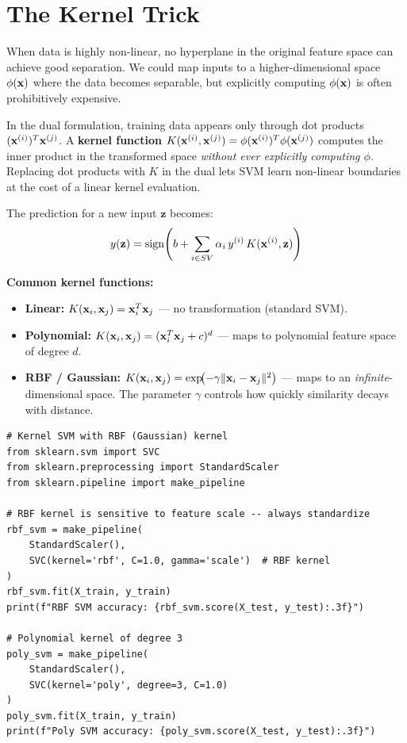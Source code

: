 \section*{The Kernel Trick}

When data is highly non-linear, no hyperplane in the original feature space can achieve good separation. We could map inputs to a higher-dimensional space $\phi(\mathbf{x})$ where the data becomes separable, but explicitly computing $\phi(\mathbf{x})$ is often prohibitively expensive.

\begin{definition}
In the dual formulation, training data appears only through dot products $(\mathbf{x}^{(i)})^T\mathbf{x}^{(j)}$. A \textbf{kernel function} $K(\mathbf{x}^{(i)}, \mathbf{x}^{(j)}) = \phi(\mathbf{x}^{(i)})^T \phi(\mathbf{x}^{(j)})$ computes the inner product in the transformed space \textit{without ever explicitly computing $\phi$}. Replacing dot products with $K$ in the dual lets SVM learn non-linear boundaries at the cost of a linear kernel evaluation.
\end{definition}

The prediction for a new input $\mathbf{z}$ becomes:
$$y(\mathbf{z}) = \text{sign}\!\left(b + \sum_{i \in SV} \alpha_i \, y^{(i)} \, K(\mathbf{x}^{(i)}, \mathbf{z})\right)$$

\textbf{Common kernel functions:}
\begin{itemize}
    \item \textbf{Linear:} $K(\mathbf{x}_i, \mathbf{x}_j) = \mathbf{x}_i^T \mathbf{x}_j$ \;---\; no transformation (standard SVM).
    \item \textbf{Polynomial:} $K(\mathbf{x}_i, \mathbf{x}_j) = (\mathbf{x}_i^T \mathbf{x}_j + c)^d$ \;---\; maps to polynomial feature space of degree $d$.
    \item \textbf{RBF / Gaussian:} $K(\mathbf{x}_i, \mathbf{x}_j) = \exp\!\bigl(-\gamma \|\mathbf{x}_i - \mathbf{x}_j\|^2\bigr)$ \;---\; maps to an \textit{infinite}-dimensional space. The parameter $\gamma$ controls how quickly similarity decays with distance.
\end{itemize}

\begin{lstlisting}[style=pythonstyle]
# Kernel SVM with RBF (Gaussian) kernel
from sklearn.svm import SVC
from sklearn.preprocessing import StandardScaler
from sklearn.pipeline import make_pipeline

# RBF kernel is sensitive to feature scale -- always standardize
rbf_svm = make_pipeline(
    StandardScaler(),
    SVC(kernel='rbf', C=1.0, gamma='scale')  # RBF kernel
)
rbf_svm.fit(X_train, y_train)
print(f"RBF SVM accuracy: {rbf_svm.score(X_test, y_test):.3f}")

# Polynomial kernel of degree 3
poly_svm = make_pipeline(
    StandardScaler(),
    SVC(kernel='poly', degree=3, C=1.0)
)
poly_svm.fit(X_train, y_train)
print(f"Poly SVM accuracy: {poly_svm.score(X_test, y_test):.3f}")
\end{lstlisting}

